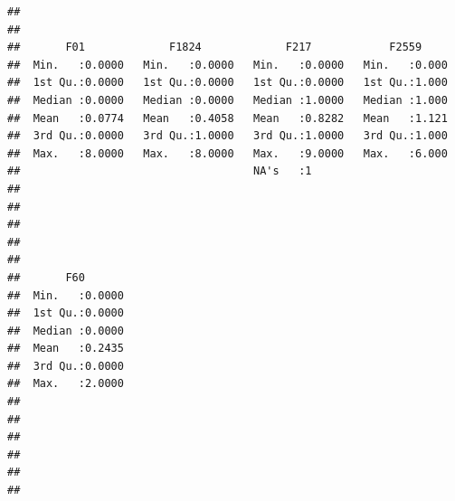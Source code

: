 \documentclass[11pt,]{article}
\begin{document}
\begin{verbatim}
##                                                                    
##                                                                    
##       F01             F1824             F217            F2559      
##  Min.   :0.0000   Min.   :0.0000   Min.   :0.0000   Min.   :0.000  
##  1st Qu.:0.0000   1st Qu.:0.0000   1st Qu.:0.0000   1st Qu.:1.000  
##  Median :0.0000   Median :0.0000   Median :1.0000   Median :1.000  
##  Mean   :0.0774   Mean   :0.4058   Mean   :0.8282   Mean   :1.121  
##  3rd Qu.:0.0000   3rd Qu.:1.0000   3rd Qu.:1.0000   3rd Qu.:1.000  
##  Max.   :8.0000   Max.   :8.0000   Max.   :9.0000   Max.   :6.000  
##                                    NA's   :1                       
##                                                                    
##                                                                    
##                                                                    
##                                                                    
##                                                                    
##       F60        
##  Min.   :0.0000  
##  1st Qu.:0.0000  
##  Median :0.0000  
##  Mean   :0.2435  
##  3rd Qu.:0.0000  
##  Max.   :2.0000  
##                  
##                  
##                  
##                  
##                  
## 
\end{verbatim}
\end{document}

